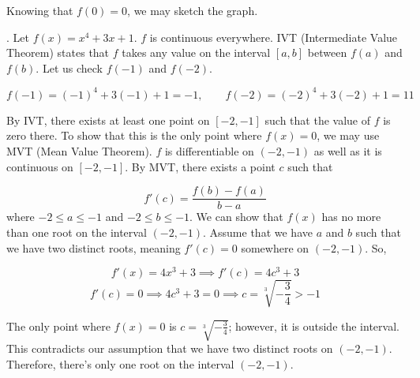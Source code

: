 \documentclass{article}
\begin{document}
\hfill

\noindent Knowing that $f(0)=0$, we may sketch the graph.

\begin{center}
\end{center}

\newpage

. Let $f(x) = x^4 +3x+1$. $f$ is continuous everywhere. IVT (Intermediate Value Theorem) states that $f$ takes any value on the interval $[a, b]$ between $f(a)$ and $f(b)$. Let us check $f(-1)$ and $f(-2)$.

\[ f(-1) = (-1)^4 + 3(-1) + 1 = -1,\qquad f(-2) = (-2)^4 + 3(-2) + 1 = 11\]

\hfill

\noindent By IVT, there exists at least one point on $[-2, -1]$ such that the value of $f$ is zero there. To show that this is the only point where $f(x) = 0$, we may use MVT (Mean Value Theorem). $f$ is differentiable on $(-2, -1)$ as well as it is continuous on $[-2, -1]$. By MVT, there exists a point $c$ such that

\[f'(c)=\frac{f(b)-f(a)}{b-a}\] where $-2\leq a \leq-1$ and $-2\leq b\leq-1$. We can show that $f(x)$ has no more than one root on the interval $(-2, -1)$. Assume that we have $a$ and $b$ such that we have two distinct roots, meaning $f'(c) = 0$ somewhere on $(-2, -1)$. So,

\[f'(x)=4x^3+3\implies f'(c)=4c^3+3\]
\[f'(c)=0\implies4c^3+3=0\implies c=\sqrt[3]{-\frac{3}{4}}>-1\]

\noindent The only point where $f(x)=0$ is $c=\sqrt[3]{-\frac{3}{4}}$; however, it is outside the interval. This contradicts our assumption that we have two distinct roots on $(-2, -1)$. Therefore, there's only one root on the interval $(-2,-1)$.
\end{document}
